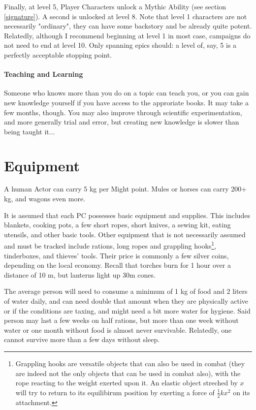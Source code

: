 Finally, at level 5, Player Characters unlock a Mythic Ability (see section \ref{signature}). A second is unlocked at level 8. Note that level 1 characters are not necessarily "ordinary", they can have some backstory and be already quite potent. Relatedly, although I recommend beginning at level 1 in most case, campaigns do not need to end at level 10. Only spanning epics should: a level of, say, 5 is a perfectly acceptable stopping point.

\paragraph{Teaching and Learning}

Someone who knows more than you do on a topic can teach you, or you can gain new knowledge yourself if you have access to the approriate books. It may take a few months, though. You may also improve through scientific experimentation, and more generally trial and error, but creating new knowledge is slower than being taught it...


\section{Equipment}

\label{equipment}

A human Actor can carry 5 kg per Might point. Mules or horses can carry 200+ kg, and wagons even more.

It is assumed that each PC possesses basic equipment and supplies. This includes blankets, cooking pots, a few short ropes, short knives, a sewing kit, eating utensils, and other basic tools. Other equipment that is not necessarily assumed and must be tracked include rations, long ropes and grappling hooks\footnote{Grappling hooks are versatile objects that can also be used in combat (they are indeed not the only objects that can be used in combat also), with the rope reacting to the weight exerted upon it. An elastic object streched by $x$ will try to return to its equilibirum position by exerting a force of $\frac{1}{2}kx^2$ on its attachment.}, tinderboxes, and thieves' tools. Their price is commonly a few silver coins, depending on the local economy. Recall that torches burn for 1 hour over a distance of 10 m, but lanterns light up 30m cones.

The average person will need to consume a minimum of 1 kg of food and 2 liters of water daily, and can need double that amount when they are physically active or if the conditions are taxing, and might need a bit more water for hygiene. Said person may last a few weeks on half rations, but more than one week without water or one month without food is almost never survivable. Relatedly, one cannot survive more than a few days without sleep.



